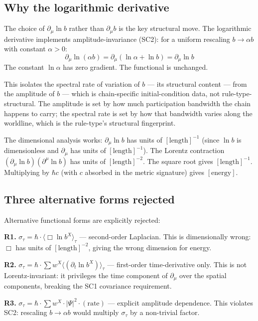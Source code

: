\documentclass[11pt,a4paper]{article}
\begin{document}
\subsection{Why the logarithmic derivative}

The choice of $\partial_\mu \ln b$ rather than $\partial_\mu b$ is the key structural move. The logarithmic derivative implements amplitude-invariance (SC2): for a uniform rescaling $b \to \alpha b$ with constant $\alpha > 0$:
\[
\partial_\mu \ln(\alpha b) = \partial_\mu(\ln\alpha + \ln b) = \partial_\mu \ln b
\]
The constant $\ln\alpha$ has zero gradient. The functional is unchanged.

This isolates the spectral rate of variation of $b$ --- its structural content --- from the amplitude of $b$ --- which is chain-specific initial-condition data, not rule-type-structural. The amplitude is set by how much participation bandwidth the chain happens to carry; the spectral rate is set by how that bandwidth varies along the worldline, which is the rule-type's structural fingerprint.

The dimensional analysis works: $\partial_\mu \ln b$ has units of $[\text{length}]^{-1}$ (since $\ln b$ is dimensionless and $\partial_\mu$ has units of $[\text{length}]^{-1}$). The Lorentz contraction $(\partial_\mu \ln b)(\partial^\mu \ln b)$ has units of $[\text{length}]^{-2}$. The square root gives $[\text{length}]^{-1}$. Multiplying by $\hbar c$ (with $c$ absorbed in the metric signature) gives $[\text{energy}]$.

\subsection{Three alternative forms rejected}

Alternative functional forms are explicitly rejected:

\textbf{R1.} $\sigma_\tau = \hbar\cdot\langle\Box\ln b^X\rangle_\tau$ --- second-order Laplacian. This is dimensionally wrong: $\Box$ has units of $[\text{length}]^{-2}$, giving the wrong dimension for energy.

\textbf{R2.} $\sigma_\tau = \hbar\cdot\sum w^X\langle(\partial_t \ln b^X)\rangle_\tau$ --- first-order time-derivative only. This is not Lorentz-invariant: it privileges the time component of $\partial_\mu$ over the spatial components, breaking the SC1 covariance requirement.

\textbf{R3.} $\sigma_\tau = \hbar\cdot\sum w^X\cdot|\Psi|^2\cdot(\text{rate})$ --- explicit amplitude dependence. This violates SC2: rescaling $b \to \alpha b$ would multiply $\sigma_\tau$ by a non-trivial factor.
\end{document}
